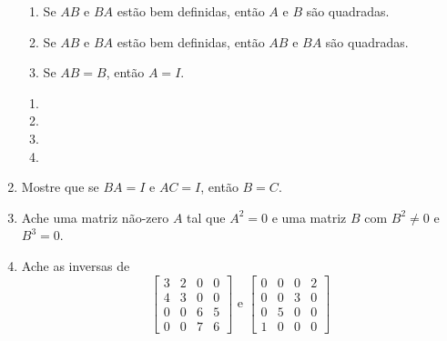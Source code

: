 \documentclass[leqno]{article}
\numberwithin{equation}{section}
\begin{document}
\begin{enumerate}
\begin{enumerate}
\item Se $AB$ e $BA$ estão bem definidas, então $A$ e $B$ são quadradas.

\item Se $AB$ e $BA$ estão bem definidas, então $AB$ e $BA$ são quadradas.

\item Se $AB = B$, então $A = I$.

\end{enumerate}

\begin{sol} 
	\begin{enumerate} 
		\item %

		\item %

		\item %

		\item %
	\end{enumerate} 
\end{sol} 

\item Mostre que se $BA = I$ e $AC = I$, então $B=C$.

\begin{sol} 
\end{sol} 

\item Ache uma matriz não-zero $A$ tal que $A^2 = 0$ e uma matriz $B$ com $B^2 \neq 0$ e $B^3 = 0$.

\begin{sol} 
\end{sol} 

\item Ache as inversas de 
$$\begin{bmatrix} 
3 & 2 & 0 & 0 \\
4 & 3 & 0 & 0 \\
0 & 0 & 6 & 5 \\
0 & 0 & 7 & 6
\end{bmatrix} \mbox{ e } 
\begin{bmatrix} 
0 & 0 & 0 & 2 \\
0 & 0 & 3 & 0 \\
0 & 5 & 0 & 0 \\
1 & 0 & 0 & 0
\end{bmatrix}$$

\begin{sol} 
\end{sol} 


\end{enumerate}
\end{document}
